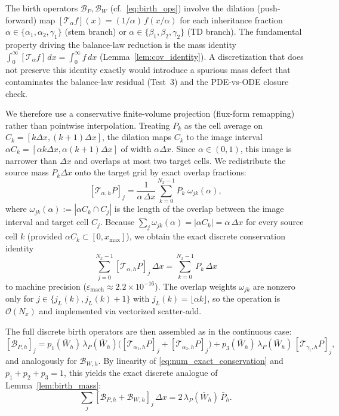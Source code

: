 \documentclass[pdflatex,sn-mathphys-ay]{sn-jnl}
\theoremstyle{thmstyleone}
\theoremstyle{definition}
\theoremstyle{remark}
\begin{document}
The birth operators $\mathcal B_P,\mathcal B_W$ (cf.~\eqref{eq:birth_ops})
involve the dilation (push-forward) map
$[\mathcal T_\alpha f](x) = (1/\alpha)\,f(x/\alpha)$
for each inheritance fraction
$\alpha\in\{\alpha_1,\alpha_2,\gamma_1\}$ (stem branch) or
$\alpha\in\{\beta_1,\beta_2,\gamma_2\}$ (TD branch).
The fundamental property driving the balance-law reduction is the mass identity
$\int_0^\infty [\mathcal T_\alpha f]\,dx = \int_0^\infty f\,dx$
(Lemma~\ref{lem:cov_identity}). A discretization that does not preserve this identity
exactly would introduce a spurious mass defect that contaminates the balance-law residual
(Test~3) and the PDE-vs-ODE closure check.

We therefore use a conservative finite-volume projection (flux-form remapping)
rather than pointwise interpolation.
Treating $P_k$ as the cell average on $C_k=[k\Delta x,(k+1)\Delta x]$, the dilation maps
$C_k$ to the image interval $\alpha C_k=[\alpha k\Delta x,\alpha(k+1)\Delta x]$ of width
$\alpha\Delta x$.
Since $\alpha\in(0,1)$, this image is narrower than $\Delta x$ and overlaps at most two
target cells.
We redistribute the source mass $P_k\Delta x$ onto the target grid by exact overlap
fractions:
\begin{equation}\label{eq:num_conservative_remap}
[\mathcal T_{\alpha,h} P]_j
= \frac{1}{\alpha\,\Delta x}\sum_{k=0}^{N_x-1} P_k\;\omega_{jk}(\alpha),
\end{equation}
where $\omega_{jk}(\alpha):=|\alpha C_k\cap C_j|$ is the length of the overlap between
the image interval and target cell $C_j$.
Because $\sum_j \omega_{jk}(\alpha)=|\alpha C_k|=\alpha\,\Delta x$ for every source cell $k$
(provided $\alpha C_k\subset[0,x_{\max}]$), we obtain the exact discrete conservation
identity
\begin{equation}\label{eq:num_exact_conservation}
\sum_{j=0}^{N_x-1} [\mathcal T_{\alpha,h} P]_j\,\Delta x
= \sum_{k=0}^{N_x-1} P_k\,\Delta x
\end{equation}
to machine precision ($\varepsilon_{\mathrm{mach}}\approx 2.2\times10^{-16}$).
The overlap weights $\omega_{jk}$ are nonzero only for $j\in\{j_L(k),j_L(k)+1\}$ with $j_L(k) = \lfloor \alpha k\rfloor$, so the
operation is $\mathcal O(N_x)$ and implemented via vectorized scatter-add.

The full discrete birth operators are then assembled as in the continuous case:
\[
[\mathcal B_{P,h}]_j
= p_1(\bar W_h)\,\lambda_P(\bar W_h)
  \bigl([\mathcal T_{\alpha_1,h}P]_j+[\mathcal T_{\alpha_2,h}P]_j\bigr)
+ p_3(\bar W_h)\,\lambda_P(\bar W_h)\,[\mathcal T_{\gamma_1,h}P]_j,
\]
and analogously for $\mathcal B_{W,h}$.
By linearity of \eqref{eq:num_exact_conservation} and $p_1+p_2+p_3=1$, this yields the
exact discrete analogue of Lemma~\ref{lem:birth_mass}:
\[
\sum_j [\mathcal B_{P,h}+\mathcal B_{W,h}]_j\,\Delta x
= 2\,\lambda_P(\bar W_h)\,\bar P_h.
\]
\end{document}
